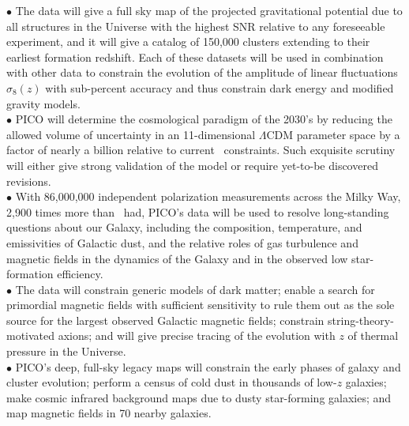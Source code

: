 \documentclass[PICOAPC.tex]{subfiles}
\begin{document}
$\bullet$ The data will give a full sky map of the projected gravitational potential due to all structures in the Universe with the highest \ac{SNR} relative to any foreseeable experiment, and it will give a catalog of 150,000 clusters extending to their earliest formation redshift. Each of these datasets will be used in combination with other data to constrain the evolution of the amplitude of linear fluctuations $\sigma_{8}(z)$ with sub-percent accuracy and thus constrain dark energy and modified gravity models.  \\
$\bullet$ PICO will determine the cosmological paradigm of the 2030's by reducing the allowed volume of uncertainty in an 11-dimensional $ \Lambda$CDM parameter space by a factor of nearly a billion relative to current \planck\ constraints. %
Such exquisite scrutiny will either give strong validation of the model or require yet-to-be discovered revisions. \\
$\bullet$ With 86,000,000 independent polarization measurements across the Milky Way, 2,900 times more than \planck \ had, PICO's data will be used to resolve long-standing questions about our Galaxy, including the 
composition, temperature, and emissivities of Galactic dust, and the relative roles of gas turbulence and magnetic fields in the dynamics of the Galaxy and in the observed low star-formation efficiency. \\
$\bullet$ The data will constrain generic models of dark matter; enable a search for primordial magnetic fields with sufficient sensitivity to rule them out as the sole source for the largest observed Galactic magnetic fields; constrain string-theory-motivated axions; 
and will give precise tracing of the evolution with $z$ of thermal pressure in the Universe. \\ 
$\bullet$ PICO's deep, full-sky legacy maps will constrain the early phases of galaxy and cluster evolution;  
perform a census of cold dust in thousands of low-$z$ galaxies; make cosmic infrared background maps 
due to dusty star-forming galaxies; and map magnetic fields in 70 nearby galaxies. 
\end{document}
